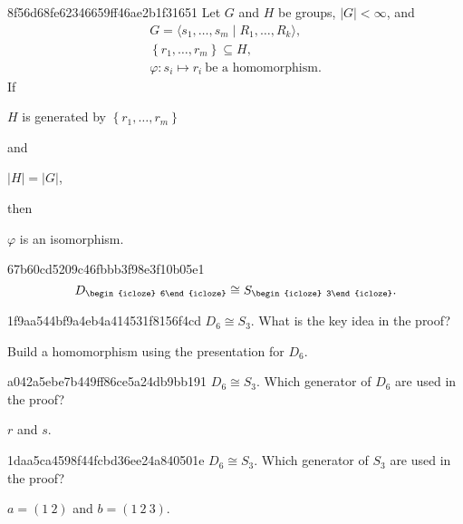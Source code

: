 \begin{note}{8f56d68fe62346659ff46ae2b1f31651}
    Let \({ G }\) and \({ H }\) be groups, \({ \left\lvert G \right\rvert < \infty }\), and
    \[
        \begin{gathered}
            G = \langle s_1, \ldots, s_m \mid R_1, \ldots, R_k \rangle, \\
            \left\{ r_1, \ldots, r_m \right\} \subseteq H, \\
            \varphi : s_i \mapsto r_i\ \text{be a homomorphism}.
        \end{gathered}
    \]
    If \begin{icloze}{3}\({ H }\) is generated by \({ \left\{ r_1, \ldots, r_m \right\} }\)\end{icloze} and \begin{icloze}{2}\({ \left\lvert H \right\rvert = \left\lvert G \right\rvert }\),\end{icloze} then \begin{icloze}{1}\({ \varphi }\) is an isomorphism.\end{icloze}
\end{note}

\begin{note}{67b60cd5209c46fbbb3f98e3f10b05e1}
    \[
        D_{\begin{icloze}{2}6\end{icloze}} \cong S_{\begin{icloze}{1}3\end{icloze}}.
    \]
\end{note}

\begin{note}{1f9aa544bf9a4eb4a414531f8156f4cd}
    \({ D_{6} \cong S_{3} }\). What is the key idea in the proof?

    \begin{cloze}{1}
        Build a homomorphism using the presentation for \({ D_6 }\).
    \end{cloze}
\end{note}

\begin{note}{a042a5ebe7b449ff86ce5a24db9bb191}
    \({ D_{6} \cong S_{3} }\). Which generator of \({ D_6 }\) are used in the proof?

    \begin{cloze}{1}
        \({ r }\) and \({ s }\).
    \end{cloze}
\end{note}

\begin{note}{1daa5ca4598f44fcbd36ee24a840501e}
    \({ D_{6} \cong S_{3} }\). Which generator of \({ S_3 }\) are used in the proof?

    \begin{cloze}{1}
        \({ a = (1\: 2) }\) and \({ b = (1\: 2\: 3) }\).
    \end{cloze}
\end{note}

